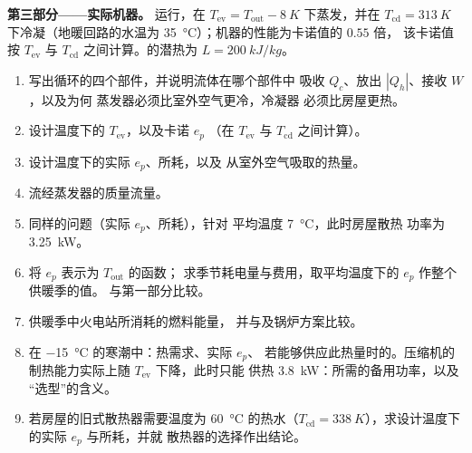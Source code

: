 \begin{problem}
\medskip
\noindent\textbf{第三部分——实际机器。}
运行，在
$T_{\mathrm{ev}} = T_{\mathrm{out}} - \qty{8}{K}$ 下蒸发，并在
$T_{\mathrm{cd}} = \qty{313}{K}$ 下冷凝（地暖回路的水温为
\qty{35}{\degreeCelsius}）；机器的性能为卡诺值的 $0.55$ 倍，
该卡诺值按 $T_{\mathrm{ev}}$ 与 $T_{\mathrm{cd}}$ 之间计算。的潜热为
$L = \qty{200}{kJ/kg}$。
\begin{enumerate}[resume]
  \item 写出循环的四个部件，并说明流体在哪个部件中
        吸收 $Q_c$、放出 $|Q_h|$、接收 $W$，以及为何
        蒸发器必须比室外空气更冷，冷凝器
        必须比房屋更热。
  \item 设计温度下的 $T_{\mathrm{ev}}$，以及卡诺 $e_p$
        （在 $T_{\mathrm{ev}}$ 与 $T_{\mathrm{cd}}$ 之间计算）。
  \item 设计温度下的实际 $e_p$、所耗，以及
        从室外空气吸取的热量。
  \item 流经蒸发器的质量流量。
  \item 同样的问题（实际 $e_p$、所耗），针对
        平均温度 \qty{7}{\degreeCelsius}，此时房屋散热
        功率为 \qty{3.25}{kW}。
  \item 将 $e_p$ 表示为 $T_{\mathrm{out}}$ 的函数；
        求季节耗电量与费用，取平均温度下的 $e_p$ 作整个供暖季的值。
        与第一部分比较。
  \item {}供暖季中火电站所消耗的燃料能量，
        并与及锅炉方案比较。
  \item 在 \qty{-15}{\degreeCelsius} 的寒潮中：热需求、实际 $e_p$、
        若能够供应此热量时的。压缩机的
        制热能力实际上随 $T_{\mathrm{ev}}$ 下降，此时只能
        供热 \qty{3.8}{kW}：所需的备用功率，以及
        “选型”的含义。
  \item 若房屋的旧式散热器需要温度为
        \qty{60}{\degreeCelsius} 的热水（$T_{\mathrm{cd}} = \qty{338}{K}$），求设计温度下的实际 $e_p$
        与所耗，并就
        散热器的选择作出结论。
\end{enumerate}


\end{problem}
